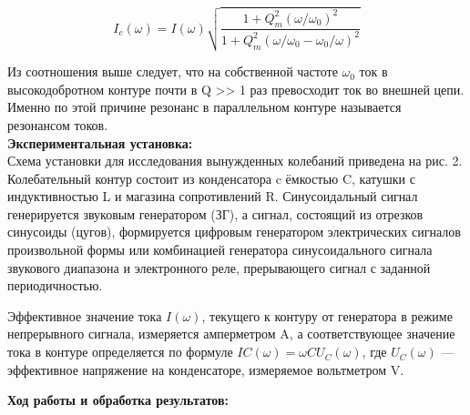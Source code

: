 \documentclass[a4paper, 12pt]{article}%
\begin{document}
	
	$$ I_c(\omega) = I(\omega) \sqrt{\frac{1 + Q_m^2(\omega/\omega_0)^2}{1 + Q_m^2(\omega/\omega_0 - \omega_0/\omega)^2}}$$
	
	
	Из соотношения выше следует, что на собственной частоте $\omega_0$ ток в
	высокодобротном контуре почти в Q >> 1 раз превосходит ток во внешней цепи. Именно по этой причине резонанс в параллельном контуре
	называется резонансом токов.\\
	
	
	\textbf{Экспериментальная установка: }\\
	Схема установки для исследования вынужденных колебаний приведена на рис. 2. Колебательный контур состоит из конденсатора c ёмкостью C, катушки с индуктивностью L и магазина сопротивлений R.
	Синусоидальный сигнал генерируется звуковым генератором (ЗГ), а сигнал, состоящий из отрезков синусоиды (цугов), формируется цифровым
	генератором электрических сигналов произвольной формы или комбинацией генератора синусоидального сигнала звукового диапазона и электронного реле, прерывающего сигнал с заданной периодичностью.
	
	Эффективное значение тока $I(\omega)$, текущего к контуру от генератора в режиме непрерывного сигнала, измеряется амперметром A, а
	соответствующее значение тока в контуре определяется по формуле
	$IC(\omega) = \omega CU_C(\omega)$, где $U_C(\omega)$ — эффективное напряжение на конденсаторе, измеряемое вольтметром V.
	
	\begin{figure}[h]
	\end{figure}
	
	\newpage
	
	\textbf{Ход работы и обработка результатов: }\\
	
\end{document}
